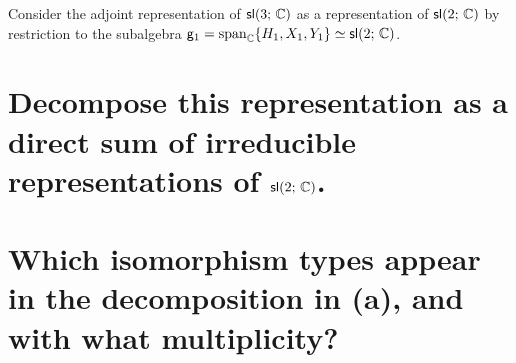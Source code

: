 \documentclass[
	pages,
	boxes,
	color=WildStrawberry
]{homework}
\begin{document}
\begin{problem}
Consider the adjoint representation of $\mathsf{sl}(3;\, \mathbb{C})$ as a representation of $\mathsf{sl}(2;\, \mathbb{C})$ by restriction to the subalgebra $\mathsf{g}_1 = \operatorname{span}_{\mathbb{C}}\{H_1, X_1, Y_1\} \simeq \mathsf{sl}(2;\, \mathbb{C})$.
\begin{parts}
	\part{Decompose this representation as a direct sum of irreducible representations of $\mathsf{sl}(2;\, \mathbb{C})$.}\label{part:1a}
	\part{Which isomorphism types appear in the decomposition in (a), and with what multiplicity?}\label{part:1b}
\end{parts}
\end{problem}
\end{document}
